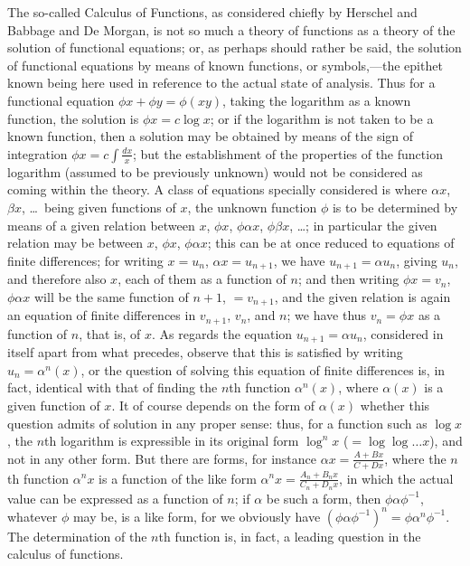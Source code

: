 \documentclass[11pt,a4paper]{book}
\begin{document}
The so-called Calculus of Functions, as considered chiefly by Herschel and Babbage and De Morgan, is not so much a theory of functions as a theory of the solution of functional equations; or, as perhaps should rather be said, the solution of functional equations by means of known functions, or symbols,---the epithet known being here used in reference to the actual state of analysis. Thus for a functional equation $\phi x + \phi y = \phi(xy)$, taking the logarithm as a known function, the solution is $\phi x = c\log x$; or if the logarithm is not taken to be a known function, then a solution may be obtained by means of the sign of integration $\phi x = c\int\frac{dx}{x}$; but the establishment of the properties of the function logarithm (assumed to be previously unknown) would not be considered as coming within the theory. A class of equations specially considered is where $\alpha x$, $\beta x$, \ldots\ being given functions of $x$, the unknown function $\phi$ is to be determined by means of a given relation between $x$, $\phi x$, $\phi\alpha x$, $\phi\beta x$, \ldots; in particular the given relation may be between $x$, $\phi x$, $\phi\alpha x$; this can be at once reduced to equations of finite differences; for writing $x = u_{n}$, $\alpha x = u_{n+1}$, we have $u_{n+1} = \alpha u_{n}$, giving $u_{n}$, and therefore also $x$, each of them as a function of $n$; and then writing $\phi x = v_{n}$, $\phi\alpha x$ will be the same function of $n + 1$, $= v_{n+1}$, and the given relation is again an equation of finite differences in $v_{n+1}$, $v_{n}$, and $n$; we have thus $v_{n} = \phi x$ as a function of $n$, that is, of $x$. As regards the equation $u_{n+1} = \alpha u_{n}$, considered in itself apart from what precedes, observe that this is satisfied by writing $u_{n} = \alpha^{n}(x)$, or the question of solving this equation of finite differences is, in fact, identical with that of finding the $n$th function $\alpha^{n}(x)$, where $\alpha(x)$ is a given function of $x$. It of course depends on the form of $\alpha(x)$ whether this question admits of solution in any proper sense: thus, for a function such as $\log x$, the $n$th logarithm is expressible in its original form $\log^{n}x$ ($= \log\log\ldots x$), and not in any other form. But there are forms, for instance $\alpha x = \frac{A + Bx}{C + Dx}$, where the $n$th function $\alpha^{n}x$ is a function of the like form $\alpha^{n}x = \frac{A_{n} + B_{n}x}{C_{n} + D_{n}x}$, in which the actual value can be expressed as a function of $n$; if $\alpha$ be such a form, then $\phi\alpha\phi^{-1}$, whatever $\phi$ may be, is a like form, for we obviously have $(\phi\alpha\phi^{-1})^{n} = \phi\alpha^{n}\phi^{-1}$. The determination of the $n$th function is, in fact, a leading question in the calculus of functions.
\end{document}
